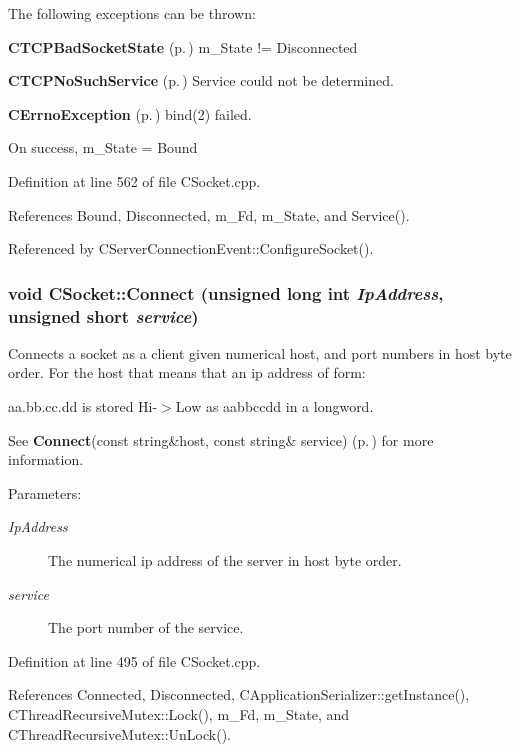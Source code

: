 The following exceptions can be thrown:

\begin{CompactItemize}
\item 
{\bf CTCPBad\-Socket\-State} {\rm (p.\,\pageref{classCTCPBadSocketState})} m\_\-State != Disconnected\item 
{\bf CTCPNo\-Such\-Service} {\rm (p.\,\pageref{classCTCPNoSuchService})} Service could not be determined.\item 
{\bf CErrno\-Exception} {\rm (p.\,\pageref{classCErrnoException})} bind(2) failed.\end{CompactItemize}
On success, m\_\-State = Bound 

Definition at line 562 of file CSocket.cpp.

References Bound, Disconnected, m\_\-Fd, m\_\-State, and Service().

Referenced by CServer\-Connection\-Event::Configure\-Socket().
\subsubsection{\setlength{\rightskip}{0pt plus 5cm}void CSocket::Connect (unsigned long int {\em Ip\-Address}, unsigned short {\em service})}\label{classCSocket_a6}


Connects a socket as a client given numerical host, and port numbers in  host byte order. For the host that means that an ip address of form:

aa.bb.cc.dd is stored Hi-$>$Low as aabbccdd in a longword.

See {\bf Connect}(const string\&host, const string\& service) {\rm (p.\,\pageref{classCSocket_a5})} for more information.\begin{Desc}
\item[Parameters: ]\par
\begin{description}
\item[{\em 
Ip\-Address}]The numerical ip address of the server in host byte order. \item[{\em 
service}]The port number of the service. \end{description}
\end{Desc}


Definition at line 495 of file CSocket.cpp.

References Connected, Disconnected, CApplication\-Serializer::get\-Instance(), CThread\-Recursive\-Mutex::Lock(), m\_\-Fd, m\_\-State, and CThread\-Recursive\-Mutex::Un\-Lock().
